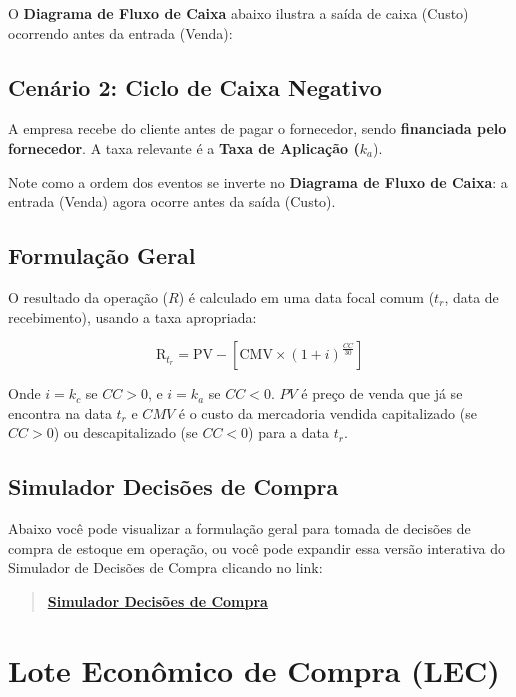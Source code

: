 \documentclass[
  a4paper,
]{book}
\begin{document}
O \textbf{Diagrama de Fluxo de Caixa} abaixo ilustra a saída de caixa
(Custo) ocorrendo antes da entrada (Venda):

\subsection{Cenário 2: Ciclo de Caixa
Negativo}\label{cenuxe1rio-2-ciclo-de-caixa-negativo}

A empresa recebe do cliente antes de pagar o fornecedor, sendo
\textbf{financiada pelo fornecedor}. A taxa relevante é a \textbf{Taxa
de Aplicação (}\(k_a\)).

Note como a ordem dos eventos se inverte no \textbf{Diagrama de Fluxo de
Caixa}: a entrada (Venda) agora ocorre antes da saída (Custo).

\subsection{Formulação Geral}\label{formulauxe7uxe3o-geral}

O resultado da operação (\(R\)) é calculado em uma data focal comum
(\(t_r\), data de recebimento), usando a taxa apropriada:

\[
\text{R}_{t_r} = \text{PV} - \left[ \text{CMV} \times (1 + i)^{\frac{CC}{30}} \right]
\]

Onde \(i = k_c\) se \(CC > 0\), e \(i = k_a\) se \(CC < 0\). \(PV\) é
preço de venda que já se encontra na data \(t_r\) e \(CMV\) é o custo da
mercadoria vendida capitalizado (se \(CC > 0\)) ou descapitalizado (se
\(CC < 0\)) para a data \(t_r\).

\subsection{Simulador Decisões de
Compra}\label{simulador-decisuxf5es-de-compra}

Abaixo você pode visualizar a formulação geral para tomada de decisões
de compra de estoque em operação, ou você pode expandir essa versão
interativa do Simulador de Decisões de Compra clicando no link:

\begin{quote}
\href{resources/05-decisoes-compra.html}{\textbf{Simulador Decisões de
Compra}}
\end{quote}

\section{Lote Econômico de Compra
(LEC)}\label{lote-econuxf4mico-de-compra-lec}
\end{document}
